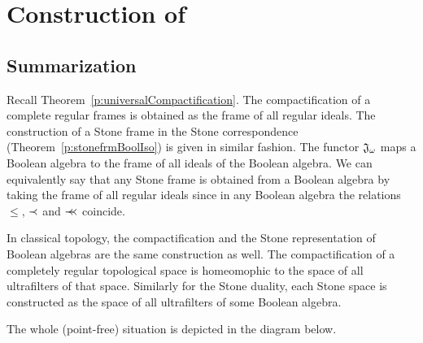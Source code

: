 \chapter{Construction of \R}

\section{Summarization}

Recall Theorem~\ref{p:universalCompactification}. The compactification of a complete regular frames is obtained as the frame of all regular ideals. The construction of a Stone frame in the Stone correspondence (Theorem~\ref{p:stonefrmBoolIso}) is given in similar fashion. The functor $\mathfrak{J}_{\omega}$ maps a Boolean algebra to the frame of all ideals of the Boolean algebra. We can equivalently say that any Stone frame is obtained from a Boolean algebra by taking the frame of all regular ideals since in any Boolean algebra the relations $\leq$, $\prec$ and $\prec\mkern-8mu\prec$ coincide.

In classical topology, the compactification and the Stone representation of Boolean algebras are the same construction as well.
The compactification of a completely regular topological space is homeomophic to the space of all ultrafilters of that space. Similarly for the Stone duality, each Stone space is constructed as the space of all ultrafilters of some Boolean algebra.

The whole (point-free) situation is depicted in the diagram below.


